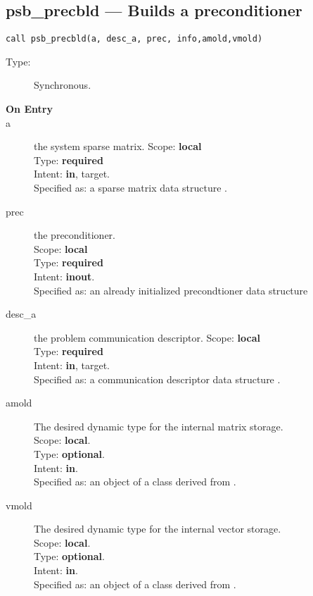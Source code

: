 \clearpage\subsection*{psb\_precbld --- Builds a preconditioner}

\begin{verbatim}
call psb_precbld(a, desc_a, prec, info,amold,vmold)
\end{verbatim}

\begin{description}
\item[Type:] Synchronous.
\item[\bf On Entry]
\item[a] the system sparse matrix.
Scope: {\bf local} \\
Type: {\bf required}\\
Intent: {\bf in}, target.\\
Specified as: a sparse matrix data structure \spdata.
\item[prec] the preconditioner.\\
Scope: {\bf local} \\
Type: {\bf required}\\
Intent: {\bf inout}.\\
Specified as: an already initialized precondtioner data structure \precdata\\
\item[desc\_a] the problem communication descriptor. 
Scope: {\bf local} \\
Type: {\bf required}\\
Intent: {\bf in}, target.\\
Specified as: a communication descriptor data structure \descdata.
\item[amold] The desired dynamic type for the internal matrix storage.\\
Scope: {\bf local}.\\
Type: {\bf optional}.\\
Intent: {\bf in}.\\
Specified as: an object of a class derived from \spbasedata. 
\item[vmold] The desired dynamic type for the internal vector storage.\\
Scope: {\bf local}.\\
Type: {\bf optional}.\\
Intent: {\bf in}.\\
Specified as: an object of a class derived from \vbasedata. 

\end{description}

